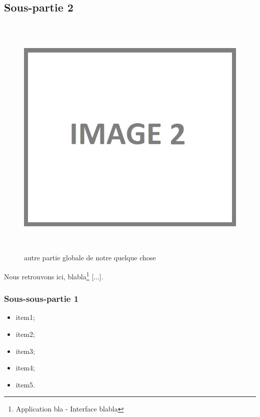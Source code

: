 \newpage{}

\subsection{Sous-partie 2}

\begin{figure}[!ht]
\begin{center}
\includegraphics[height=12cm]{autre_partie/image2}
\end{center}
\caption[autre partie]{autre partie globale de notre quelque chose}
\end{figure}

Nous retrouvons ici, blabla\footnote{Application bla - Interface blabla} [...].

\subsubsection{Sous-sous-partie 1}



\begin{itemize}
\item item1;
\item item2;
\item item3;
\item item4;
\item item5.
\end{itemize}

\newpage

